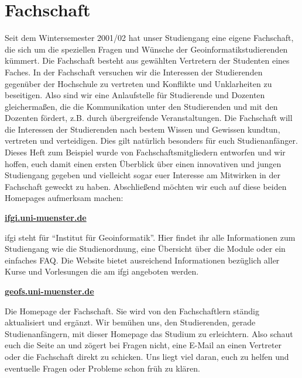 \section*{Fachschaft}
Seit dem Wintersemester 2001/02 hat unser Studiengang eine eigene Fachschaft, die sich um die speziellen Fragen und Wünsche der Geoinformatikstudierenden kümmert. Die Fachschaft besteht aus gewählten Vertretern der Studenten eines Faches. In der Fachschaft versuchen wir die Interessen der Studierenden gegenüber der Hochschule zu vertreten und Konﬂikte und Unklarheiten zu beseitigen. Also sind wir eine Anlaufstelle für Studierende und Dozenten gleichermaßen, die die Kommunikation unter den Studierenden und mit den Dozenten fördert, z.B. durch übergreifende Veranstaltungen. Die Fachschaft will die Interessen der Studierenden nach bestem Wissen und Gewissen kundtun, vertreten und verteidigen. Dies gilt natürlich besonders für euch Studienanfänger. Dieses Heft zum Beispiel wurde von Fachschaftsmitgliedern entworfen und wir hoffen, euch damit einen ersten Überblick über einen innovativen und jungen Studiengang gegeben und vielleicht sogar euer Interesse am Mitwirken in der Fachschaft geweckt zu haben. Abschließend möchten wir euch auf diese beiden Homepages aufmerksam machen:

\begin{center}
\textbf{\url{ifgi.uni-muenster.de}}\\
\end{center}

ifgi steht für "`Institut für Geoinformatik"'. Hier ﬁndet ihr alle Informationen zum Studiengang wie die Studienordnung, eine Übersicht über die Module oder ein einfaches FAQ. Die Website bietet ausreichend Informationen bezüglich aller Kurse und Vorlesungen die am ifgi angeboten werden. %

\begin{center}
\textbf{\url{geofs.uni-muenster.de}}\\
\end{center}

Die Homepage der Fachschaft. Sie wird von den Fachschaftlern ständig aktualisiert und ergänzt. Wir bemühen uns, den Studierenden, gerade Studienanfängern, mit dieser Homepage das Studium zu erleichtern. Also schaut euch die Seite an und zögert bei Fragen nicht, eine E-Mail an einen Vertreter oder die Fachschaft direkt zu schicken. Uns liegt viel daran, euch zu helfen und eventuelle Fragen oder Probleme schon früh zu klären. 

